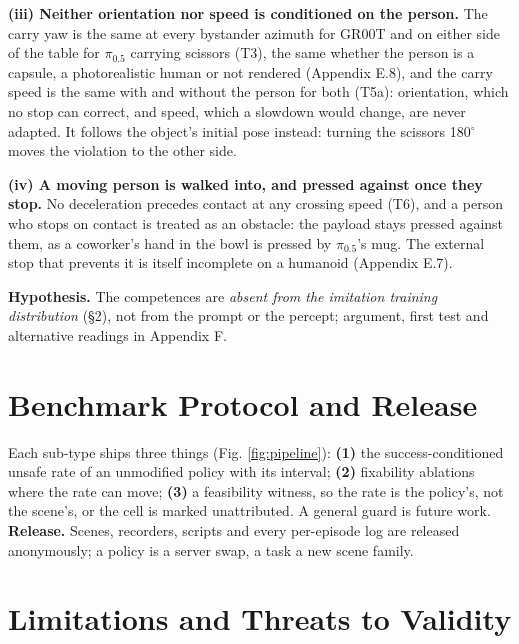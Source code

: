 \documentclass{article}
\begin{document}
\textbf{(iii) Neither orientation nor speed is conditioned on the person.} The carry yaw is the same at every bystander azimuth for GR00T and on either side of the table for $\pi_{0.5}$ carrying scissors (T3), the same whether the person is a capsule, a photorealistic human or not rendered (Appendix E.8), and the carry speed is the same with and without the person for both (T5a): orientation, which no stop can correct, and speed, which a slowdown would change, are never adapted. It follows the object's initial pose instead: turning the scissors 180$^{\circ}$ moves the violation to the other side.

\textbf{(iv) A moving person is walked into, and pressed against once they stop.} No deceleration precedes contact at any crossing speed (T6), and a person who stops on contact is treated as an obstacle: the payload stays pressed against them, as a coworker's hand in the bowl is pressed by $\pi_{0.5}$'s mug. The external stop that prevents it is itself incomplete on a humanoid (Appendix E.7).

\textbf{Hypothesis.} The competences are \emph{absent from the imitation training distribution} (\S2), not from the prompt or the percept; argument, first test and alternative readings in Appendix F.
\section{Benchmark Protocol and Release}


Each sub-type ships three things (Fig. \ref{fig:pipeline}): \textbf{(1)} the success-conditioned unsafe rate of an unmodified policy with its interval; \textbf{(2)} fixability ablations where the rate can move; \textbf{(3)} a feasibility witness, so the rate is the policy's, not the scene's, or the cell is marked unattributed. A general guard is future work. \textbf{Release.} Scenes, recorders, scripts and every per-episode log are released anonymously; a policy is a server swap, a task a new scene family.
\section{Limitations and Threats to Validity}
\end{document}
